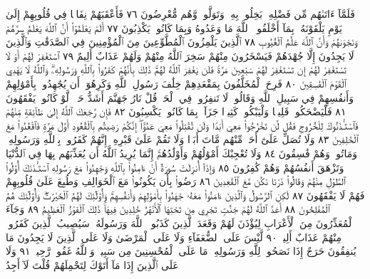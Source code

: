 فَلَمَّآ ءَاتَىٰهُم مِّن فَضْلِهِۦ بَخِلُوا۟ بِهِۦ وَتَوَلَّوا۟ وَّهُم
مُّعْرِضُونَ ٧٦ فَأَعْقَبَهُمْ نِفَاقࣰا فِي قُلُوبِهِمْ إِلَىٰ يَوْمِ يَلْقَوْنَهُۥ
بِمَآ أَخْلَفُوا۟ ٱللَّهَ مَا وَعَدُوهُ وَبِمَا كَانُوا۟ يَكْذِبُونَ ٧٧
أَلَمْ يَعْلَمُوٓا۟ أَنَّ ٱللَّهَ يَعْلَمُ سِرَّهُمْ وَنَجْوَىٰهُمْ وَأَنَّ ٱللَّهَ
عَلَّٰمُ ٱلْغُيُوبِ ٧٨ ٱلَّذِينَ يَلْمِزُونَ ٱلْمُطَّوِّعِينَ مِنَ
ٱلْمُؤْمِنِينَ فِي ٱلصَّدَقَٰتِ وَٱلَّذِينَ لَا يَجِدُونَ إِلَّا جُهْدَهُمْ
فَيَسْخَرُونَ مِنْهُمْ سَخِرَ ٱللَّهُ مِنْهُمْ وَلَهُمْ عَذَابٌ أَلِيمٌ ٧٩
ٱسْتَغْفِرْ لَهُمْ أَوْ لَا تَسْتَغْفِرْ لَهُمْ إِن تَسْتَغْفِرْ لَهُمْ سَبْعِينَ مَرَّةࣰ
فَلَن يَغْفِرَ ٱللَّهُ لَهُمْۚ ذَٰلِكَ بِأَنَّهُمْ كَفَرُوا۟ بِٱللَّهِ وَرَسُولِهِۦۗ
وَٱللَّهُ لَا يَهْدِي ٱلْقَوْمَ ٱلْفَٰسِقِينَ ٨٠ فَرِحَ ٱلْمُخَلَّفُونَ بِمَقْعَدِهِمْ
خِلَٰفَ رَسُولِ ٱللَّهِ وَكَرِهُوٓا۟ أَن يُجَٰهِدُوا۟ بِأَمْوَٰلِهِمْ وَأَنفُسِهِمْ
فِي سَبِيلِ ٱللَّهِ وَقَالُوا۟ لَا تَنفِرُوا۟ فِي ٱلْحَرِّۗ قُلْ نَارُ جَهَنَّمَ أَشَدُّ حَرࣰّاۚ
لَّوْ كَانُوا۟ يَفْقَهُونَ ٨١ فَلْيَضْحَكُوا۟ قَلِيلࣰا وَلْيَبْكُوا۟ كَثِيرࣰا جَزَآءَۢ
بِمَا كَانُوا۟ يَكْسِبُونَ ٨٢ فَإِن رَّجَعَكَ ٱللَّهُ إِلَىٰ طَآئِفَةࣲ
مِّنْهُمْ فَٱسْتَـْٔذَنُوكَ لِلْخُرُوجِ فَقُل لَّن تَخْرُجُوا۟ مَعِيَ أَبَدࣰا وَلَن
تُقَٰتِلُوا۟ مَعِيَ عَدُوًّاۖ إِنَّكُمْ رَضِيتُم بِٱلْقُعُودِ أَوَّلَ مَرَّةࣲ فَٱقْعُدُوا۟
مَعَ ٱلْخَٰلِفِينَ ٨٣ وَلَا تُصَلِّ عَلَىٰٓ أَحَدࣲ مِّنْهُم مَّاتَ أَبَدࣰا وَلَا تَقُمْ
عَلَىٰ قَبْرِهِۦٓۖ إِنَّهُمْ كَفَرُوا۟ بِٱللَّهِ وَرَسُولِهِۦ وَمَاتُوا۟ وَهُمْ فَٰسِقُونَ ٨٤
وَلَا تُعْجِبْكَ أَمْوَٰلُهُمْ وَأَوْلَٰدُهُمْۚ إِنَّمَا يُرِيدُ ٱللَّهُ أَن يُعَذِّبَهُم
بِهَا فِي ٱلدُّنْيَا وَتَزْهَقَ أَنفُسُهُمْ وَهُمْ كَٰفِرُونَ ٨٥ وَإِذَآ
أُنزِلَتْ سُورَةٌ أَنْ ءَامِنُوا۟ بِٱللَّهِ وَجَٰهِدُوا۟ مَعَ رَسُولِهِ ٱسْتَـْٔذَنَكَ
أُو۟لُوا۟ ٱلطَّوْلِ مِنْهُمْ وَقَالُوا۟ ذَرْنَا نَكُن مَّعَ ٱلْقَٰعِدِينَ ٨٦
رَضُوا۟ بِأَن يَكُونُوا۟ مَعَ ٱلْخَوَالِفِ وَطُبِعَ عَلَىٰ قُلُوبِهِمْ فَهُمْ
لَا يَفْقَهُونَ ٨٧ لَٰكِنِ ٱلرَّسُولُ وَٱلَّذِينَ ءَامَنُوا۟ مَعَهُۥ
جَٰهَدُوا۟ بِأَمْوَٰلِهِمْ وَأَنفُسِهِمْۚ وَأُو۟لَٰٓئِكَ لَهُمُ ٱلْخَيْرَٰتُۖ
وَأُو۟لَٰٓئِكَ هُمُ ٱلْمُفْلِحُونَ ٨٨ أَعَدَّ ٱللَّهُ لَهُمْ جَنَّٰتࣲ تَجْرِي
مِن تَحْتِهَا ٱلْأَنْهَٰرُ خَٰلِدِينَ فِيهَاۚ ذَٰلِكَ ٱلْفَوْزُ ٱلْعَظِيمُ ٨٩
وَجَآءَ ٱلْمُعَذِّرُونَ مِنَ ٱلْأَعْرَابِ لِيُؤْذَنَ لَهُمْ وَقَعَدَ ٱلَّذِينَ
كَذَبُوا۟ ٱللَّهَ وَرَسُولَهُۥۚ سَيُصِيبُ ٱلَّذِينَ كَفَرُوا۟ مِنْهُمْ عَذَابٌ
أَلِيمࣱ ٩٠ لَّيْسَ عَلَى ٱلضُّعَفَآءِ وَلَا عَلَى ٱلْمَرْضَىٰ وَلَا عَلَى ٱلَّذِينَ
لَا يَجِدُونَ مَا يُنفِقُونَ حَرَجٌ إِذَا نَصَحُوا۟ لِلَّهِ وَرَسُولِهِۦۚ
مَا عَلَى ٱلْمُحْسِنِينَ مِن سَبِيلࣲۚ وَٱللَّهُ غَفُورࣱ رَّحِيمࣱ ٩١
وَلَا عَلَى ٱلَّذِينَ إِذَا مَآ أَتَوْكَ لِتَحْمِلَهُمْ قُلْتَ لَآ أَجِدُ
